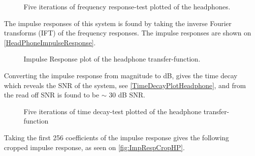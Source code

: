 \begin{figure}[H]
	\centering
	
	\caption{Five iterations of frequency response-test plotted of the headphones.}
	\label{HeadPhoneFrequencyResponsePlot}
\end{figure}




The impulse responses of this system is found by taking the inverse Fourier transforms (IFT) of the frequency responses.
The impulse responses are shown on \autoref{HeadPhoneImpulseResponse}.


\begin{figure}[H]
	\centering
	
	\caption{Impulse Response plot of the headphone transfer-function.}
	\label{HeadPhoneImpulseResponse}
\end{figure}

%	

Converting the impulse response from magnitude to dB, gives the time decay which reveals the SNR  of the system, see \autoref{TimeDecayPlotHeadphone}, and from the read off SNR is found to be $\sim$ 30 dB SNR. 

\begin{figure}[H]
	\centering
	
	\caption{Five iterations of time decay-test plotted of the headphone transfer-function}
	\label{TimeDecayPlotHeadphone}
\end{figure}

Taking the first 256 coefficients of the impulse response gives the following cropped impulse response, as seen on \autoref{fig:ImpRespCropHP}.

